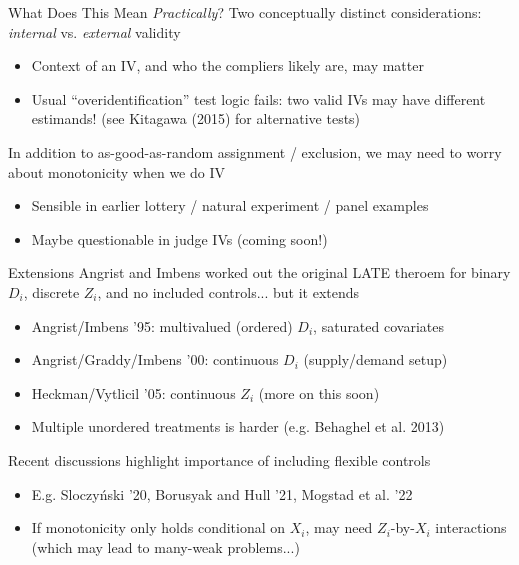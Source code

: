 \documentclass{beamer}
\begin{document}
\begin{frame}{What Does This Mean \emph{Practically}?} 
Two conceptually distinct considerations: \emph{internal} vs. \emph{external} validity\smallskip
\begin{itemize}
\item Context of an IV, and who the compliers likely are, may matter\smallskip
\item Usual ``overidentification'' test logic fails: two valid IVs may have different estimands! (see Kitagawa (2015) for alternative tests)
\end{itemize}\medskip\pause{}
In addition to as-good-as-random assignment / exclusion, we may need to worry about monotonicity when we do IV\smallskip
\begin{itemize}
\item Sensible in earlier lottery / natural experiment / panel examples \smallskip
\item Maybe questionable in judge IVs (coming soon!)
\end{itemize}
\end{frame}


\begin{frame}{Extensions}
\vspace{-0.2cm}
Angrist and Imbens worked out the original LATE theroem for binary $D_i$, discrete $Z_i$, and no included controls\pause{}... but it extends\smallskip\pause{}
\begin{itemize}
\item Angrist/Imbens '95: multivalued (ordered) $D_i$, saturated covariates\smallskip
\item Angrist/Graddy/Imbens '00: continuous $D_i$ (supply/demand setup)\smallskip
\item Heckman/Vytlicil '05: continuous $Z_i$ (more on this soon)\smallskip
\item Multiple unordered treatments is harder (e.g. Behaghel et al. 2013)
\end{itemize}\medskip\pause{}
Recent discussions highlight importance of including flexible controls\smallskip
\begin{itemize}
\item E.g. Sloczy\'{n}ski '20, Borusyak and Hull '21, Mogstad et al. '22\smallskip
\item If monotonicity only holds conditional on $X_i$, may need $Z_i$-by-$X_i$ interactions (which may lead to many-weak problems...)
\end{itemize}
\end{frame}
\end{document}
